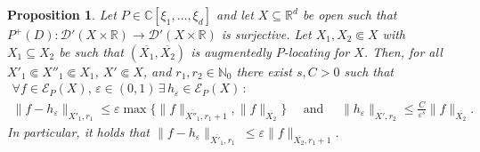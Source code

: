 \documentclass[12pt]{amsart}
\newcommand{\N}{\mathbb{N}}
\newcommand{\R}{\mathbb{R}}
\newcommand{\C}{\mathbb{C}}
\newtheorem{proposition}[theorem]{Proposition}
\theoremstyle{definition}
\theoremstyle{remark}
\numberwithin{equation}{section}
\begin{document}
\begin{proposition}\label{cor: explicit Omega}
	Let $P\in\C[\xi_1,\ldots,\xi_d]$ and let $X \subseteq \R^d$ be open such that $P^+(D): \mathscr{D}'(X \times \R) \to \mathscr{D}'(X \times \R)$ is surjective. Let $X_1, X_2 \Subset X$ with $X_1 \subseteq X_2$ be such that $(\overline{X_1}, \overline{X_2})$ is augmentedly $P$-locating for $X$. Then, for all $X'_1 \Subset X''_1 \Subset X_1$, $X' \Subset X$, and  $r_1,r_2\in\N_0$  there exist $s, C>0$ such that
	\begin{gather*}
	\forall f \in\mathscr{E}_P(X),\,\varepsilon\in (0,1) \,\exists\,h_\varepsilon \in\mathscr{E}_P(X) \,:\, \\ 
		\|f-h_\varepsilon\|_{\overline{X'_1},r_1}\leq\varepsilon\max\{\|f\|_{\overline{X''_1}, r_1+1}, \|f\|_{\overline{X_2}}\}  \quad
		\mbox{ and } \quad \|h_\varepsilon\|_{\overline{X'},r_2}\leq\frac{C}{\varepsilon^s}\|f\|_{\overline{X_2}}.
\end{gather*}
In particular, it holds that $	\|f-h_\varepsilon\|_{\overline{X'_1},r_1}\ \leq \varepsilon\|f\|_{\overline{X_2}, r_1+1}$.
\end{proposition}
\end{document}
